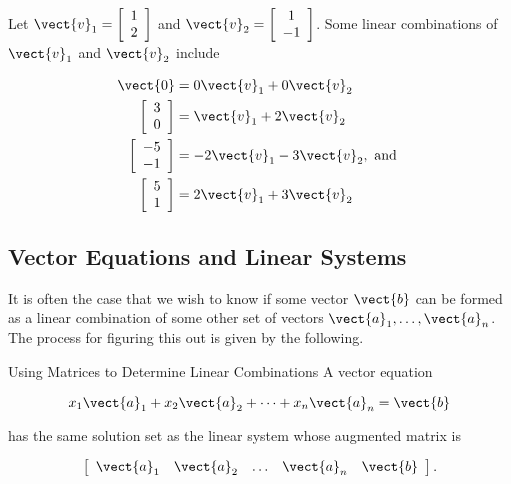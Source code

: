 \begin{example}
    Let $\vect{v}_1 = \left[\begin{array}{l}
        1 \\
        2
        \end{array}\right]$ and $\vect{v}_2 = \left[\begin{array}{c}
        1 \\
        -1
        \end{array}\right]$. Some linear combinations of $\vect{v}_1$ and $\vect{v}_2$ include
        
        \[
        \begin{aligned}
        \vect{0} & = 0 \vect{v}_1 + 0 \vect{v}_2 \\
        {\left[\begin{array}{l}
        3 \\
        0
        \end{array}\right] } & = \vect{v}_1 + 2 \vect{v}_2 \\
        {\left[\begin{array}{l}
        -5 \\
        -1
        \end{array}\right] } & = -2 \vect{v}_1 - 3 \vect{v}_2, \text { and } \\
        {\left[\begin{array}{l}
        5 \\
        1
        \end{array}\right] } & = 2 \vect{v}_1 + 3 \vect{v}_2
        \end{aligned}
        \]
        
\end{example}

\subsection*{Vector Equations and Linear Systems}

It is often the case that we wish to know if some vector $\vect{b}$ can be formed as a linear combination of some other set of vectors $\vect{a}_1, \ldots, \vect{a}_n$. The process for figuring this out is given by the following.

\begin{custombox}{Using Matrices to Determine Linear Combinations}
A vector equation

\[
x_1 \vect{a}_1 + x_2 \vect{a}_2 + \cdots + x_n \vect{a}_n = \vect{b}
\]

has the same solution set as the linear system whose augmented matrix is

\[
\left[\begin{array}{lllll}
\vect{a}_1 & \vect{a}_2 & \ldots & \vect{a}_n & \vect{b}
\end{array}\right].
\]    
\end{custombox}


